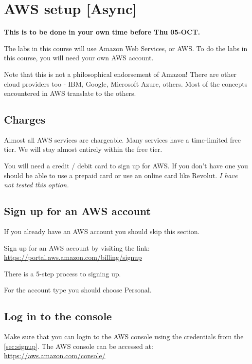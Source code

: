 \chapter{AWS setup [Async]}
\label{ch:aws-setup}

\textbf{This is to be done in your own time before Thu 05-OCT.}

The labs in this course will use Amazon Web Services, or AWS.
To do the labs in this course, you will need your own AWS account.

Note that this is not a philosophical endorsement of Amazon!
There are other cloud providers too - IBM, Google, Microsoft Azure, others.
Most of the concepts encountered in AWS translate to the others.

\section{Charges}
\label{sec:charges}

Almost all AWS services are chargeable.
Many services have a time-limited free tier.
We will stay almost entirely within the free tier. 

You will need a credit / debit card to sign up for AWS.
If you don't have one you should be able to use a prepaid card or use an online card like Revolut.
\textit{I have not tested this option.}

\section{Sign up for an AWS account}
\label{sec:signup}

If you already have an AWS account you should skip this section.

Sign up for an AWS account by visiting the link:\\
\url{https://portal.aws.amazon.com/billing/signup}

There is a 5-step process to signing up.

For the account type you should choose Personal.

\section{Log in to the console}

Make sure that you can login to the AWS console using the credentials from the \autoref{sec:signup}.
The AWS console can be accessed at:\\
\url{https://aws.amazon.com/console/}

